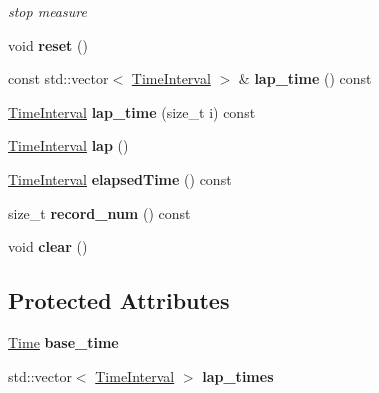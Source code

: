 \begin{DoxyCompactItemize}
\begin{DoxyCompactList}\small\item\em stop measure \end{DoxyCompactList}\item 
\hypertarget{classskl_1_1_stop_watch_a1c0dcc57c615559f24bc9f8759271a9d}{}\label{classskl_1_1_stop_watch_a1c0dcc57c615559f24bc9f8759271a9d} 
void {\bfseries reset} ()
\item 
\hypertarget{classskl_1_1_stop_watch_aef15961ff53acf72b87811599fac1e20}{}\label{classskl_1_1_stop_watch_aef15961ff53acf72b87811599fac1e20} 
const std\+::vector$<$ \hyperlink{classskl_1_1_time_interval}{Time\+Interval} $>$ \& {\bfseries lap\+\_\+time} () const
\item 
\hypertarget{classskl_1_1_stop_watch_a534efc1c95686b88f97f3712b6441f9c}{}\label{classskl_1_1_stop_watch_a534efc1c95686b88f97f3712b6441f9c} 
\hyperlink{classskl_1_1_time_interval}{Time\+Interval} {\bfseries lap\+\_\+time} (size\+\_\+t i) const
\item 
\hypertarget{classskl_1_1_stop_watch_a88365867fd14c9da7ae53201370a9b02}{}\label{classskl_1_1_stop_watch_a88365867fd14c9da7ae53201370a9b02} 
\hyperlink{classskl_1_1_time_interval}{Time\+Interval} {\bfseries lap} ()
\item 
\hypertarget{classskl_1_1_stop_watch_aafb3337fe4778a94ee4a669338b8cd72}{}\label{classskl_1_1_stop_watch_aafb3337fe4778a94ee4a669338b8cd72} 
\hyperlink{classskl_1_1_time_interval}{Time\+Interval} {\bfseries elapsed\+Time} () const
\item 
\hypertarget{classskl_1_1_stop_watch_ab2a25335e19110c6deb98ea12af02f1a}{}\label{classskl_1_1_stop_watch_ab2a25335e19110c6deb98ea12af02f1a} 
size\+\_\+t {\bfseries record\+\_\+num} () const
\item 
\hypertarget{classskl_1_1_stop_watch_aea3486e95f37ed932be6d2ced2d116d2}{}\label{classskl_1_1_stop_watch_aea3486e95f37ed932be6d2ced2d116d2} 
void {\bfseries clear} ()
\end{DoxyCompactItemize}
\subsection*{Protected Attributes}
\begin{DoxyCompactItemize}
\item 
\hypertarget{classskl_1_1_stop_watch_a73c3969e2539b2a7321fd52bb8f62143}{}\label{classskl_1_1_stop_watch_a73c3969e2539b2a7321fd52bb8f62143} 
\hyperlink{classskl_1_1_time}{Time} {\bfseries base\+\_\+time}
\item 
\hypertarget{classskl_1_1_stop_watch_a888a4bdf053fac5ea7d2dd0b1c076920}{}\label{classskl_1_1_stop_watch_a888a4bdf053fac5ea7d2dd0b1c076920} 
std\+::vector$<$ \hyperlink{classskl_1_1_time_interval}{Time\+Interval} $>$ {\bfseries lap\+\_\+times}
\end{DoxyCompactItemize}


